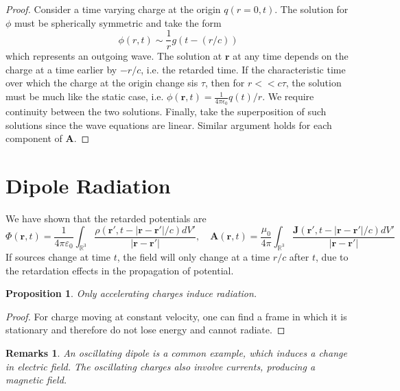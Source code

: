 \documentclass[a4paper]{article}
\newtheorem{remarks}{Remarks}[section]
\theoremstyle{new}
\newtheorem{prop}{Proposition}[section]
\begin{document}
\begin{proof}
Consider a time varying charge at the origin $q(r=0,t)$. The solution for $\phi$ must be spherically symmetric and take the form 
$$\phi(r,t)\sim\frac{1}{r}g(t-(r/c))$$
which represents an outgoing wave. The solution at $\mathbf{r}$ at any time depends on the charge at a time earlier by $-r/c$, i.e. the retarded time. If the characteristic time over which the charge at the origin change sis $\tau$, then for $r<<c\tau$, the solution must be much like the static case, i.e. $\phi(\mathbf{r},t)=\frac{1}{4\pi\epsilon_0}q(t)/r$. We require continuity between the two solutions. Finally, take the superposition of such solutions since the wave equations are linear. Similar argument holds for each component of $\mathbf{A}$.
\end{proof}
\newpage
\section{Dipole Radiation}
We have shown that the retarded potentials are
$$\Phi(\mathbf{r},t)=\frac{1}{4\pi\varepsilon_0}\int_{\mathbb{R}^3}\frac{\rho(\mathbf{r'},t-|\mathbf{r}-\mathbf{r'}|/c)dV'}{|\mathbf{r}-\mathbf{r'}|},\quad \mathbf{A}(\mathbf{r},t)=\frac{\mu_0}{4\pi}\int_{\mathbb{R}^3}\frac{\mathbf{J}(\mathbf{r'},t-|\mathbf{r}-\mathbf{r'}|/c)dV'}{|\mathbf{r}-\mathbf{r'}|}$$
If sources change at time $t$, the field will only change at a time $r/c$ after $t$, due to the retardation effects in the propagation of potential. 
\begin{prop}
Only accelerating charges induce radiation.
\end{prop}
\begin{proof}
For charge moving at constant velocity, one can find a frame in which it is stationary and therefore do not lose energy and cannot radiate.
\end{proof}
\begin{remarks}
An oscillating dipole is a common example, which induces a change in electric field. The oscillating charges also involve currents, producing a magnetic field.
\end{remarks}
\end{document}
